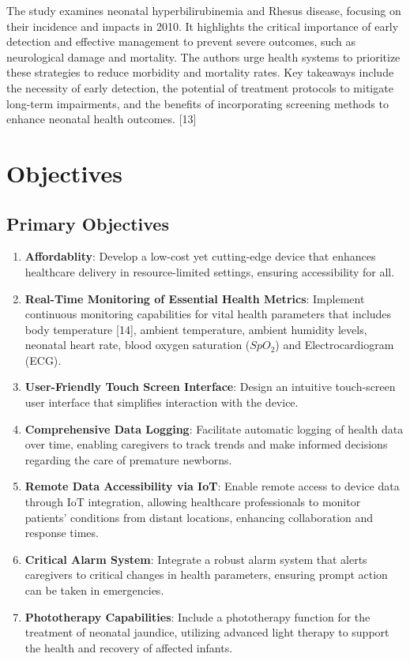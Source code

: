 \documentclass{article}
\begin{document}
The study examines neonatal hyperbilirubinemia and Rhesus disease,
focusing on their incidence and impacts in 2010. It highlights the
critical importance of early detection and effective management to
prevent severe outcomes, such as neurological damage and mortality. The
authors urge health systems to prioritize these strategies to reduce
morbidity and mortality rates. Key takeaways include the necessity of
early detection, the potential of treatment protocols to mitigate
long-term impairments, and the benefits of incorporating screening
methods to enhance neonatal health outcomes. {[}13{]}

\section{Objectives}\label{objectives}

\subsection{Primary Objectives}\label{primary-objectives}

\begin{enumerate}
\def\labelenumi{\arabic{enumi}.}
\item
  \textbf{Affordablity}: Develop a low-cost yet cutting-edge device that
  enhances healthcare delivery in resource-limited settings, ensuring
  accessibility for all.
\item
  \textbf{Real-Time Monitoring of Essential Health Metrics}: Implement
  continuous monitoring capabilities for vital health parameters that
  includes body temperature {[}14{]}, ambient temperature, ambient
  humidity levels, neonatal heart rate, blood oxygen saturation
  (\(SpO_2\)) and Electrocardiogram (ECG).
\item
  \textbf{User-Friendly Touch Screen Interface}: Design an intuitive
  touch-screen user interface that simplifies interaction with the
  device.
\item
  \textbf{Comprehensive Data Logging}: Facilitate automatic logging of
  health data over time, enabling caregivers to track trends and make
  informed decisions regarding the care of premature newborns.
\item
  \textbf{Remote Data Accessibility via IoT}: Enable remote access to
  device data through IoT integration, allowing healthcare professionals
  to monitor patients' conditions from distant locations, enhancing
  collaboration and response times.
\item
  \textbf{Critical Alarm System}: Integrate a robust alarm system that
  alerts caregivers to critical changes in health parameters, ensuring
  prompt action can be taken in emergencies.
\item
  \textbf{Phototherapy Capabilities}: Include a phototherapy function
  for the treatment of neonatal jaundice, utilizing advanced light
  therapy to support the health and recovery of affected infants.
\end{enumerate}
\end{document}
